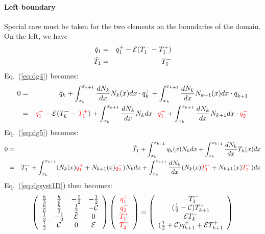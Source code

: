 \paragraph{Left boundary}
Special care must be taken for the two elements on the boundaries of the domain. 
On the left, we have 
\begin{eqnarray}
\hat{q}_1 &=& q_1^+ -{\cal E} (T_1^--T_1^+) \nonumber  \\
\hat{T}_1 &=& T_1^- \nonumber
\end{eqnarray}
Eq.~(\ref{eq:dg4}) becomes:
\begin{eqnarray}
0 
&=& \hat{q}_k   
+ \int_{x_k}^{x_{k+1}} \frac{dN_k}{dx} N_k(x) dx \cdot q_k^+ 
+ \int_{x_k}^{x_{k+1}} \frac{dN_k}{dx} N_{k+1}(x) dx \cdot q_{k+1}^- \nonumber\\ 
&=& 
{\color{red}q_1^+} - {\cal E} (T_k^- - {\color{red}T_1^+}) 
+ \int_{x_k}^{x_{k+1}} \frac{dN_k}{dx} N_k dx \cdot {\color{red}q_1^+ }
+ \int_{x_k}^{x_{k+1}} \frac{dN_k}{dx} N_{k+1} dx \cdot {\color{red} q_{2}^-}
\end{eqnarray}
Eq.~(\ref{eq:dg5}) becomes:
\begin{eqnarray}
0
&=& \hat{T}_1     
+ \int_{x_k}^{x_{k+1}}  q_h(x) N_k dx
+ \int_{x_k}^{x_{k+1}} \frac{dN_k}{dx} T_h(x) dx  \nonumber\\
&=& 
T_1^-  
+ \int_{x_k}^{x_{k+1}}  (N_k(x) {\color{red}q_1^+} + N_{k+1}(x) {\color{red}q_{2}^-}) N_k dx
+ \int_{x_k}^{x_{k+1}} \frac{dN_k}{dx} (N_k(x) {\color{red}T_1^+} + N_{k+1}(x) {\color{red}T_{2}^-})   dx 
\end{eqnarray}
Eq.~(\ref{eq:dgsyst1D}) then becomes:
\begin{eqnarray}
\left(
\begin{array}{cccc}
\frac{h}{3}    &  \frac{h}{6} & -\frac{1}{2}   &-\frac{1}{2} \\
\frac{h}{6}    &  \frac{h}{3} & \frac{1}{2} & -{\cal C} \\
\frac{1}{2}    & -\frac{1}{2} & {\cal E} & 0\\
\frac{1}{2} & {\cal C} & 0 & {\cal E}
\end{array}
\right) \left(
\begin{array}{c}
     \color{red}{q_1^+}  \\
     \color{red}{q_{2}^-} \\
     \color{red}{T_1^+} \\
     \color{red}{T_{2}^-}
\end{array}
\right)=\left(
\begin{array}{c}
     -T_1^-  \\
      (\frac{1}{2}-{\cal{C}}) T_{k+1}^+ \\
     {\cal{E}} T_k^-  \\
      (\frac{1}{2}+{\cal{C}})q_{k+1}^++{\cal{E}} T_{k+1}^+
\end{array}
\right)
\label{eq:dgsyst1Dleft}
\end{eqnarray}









